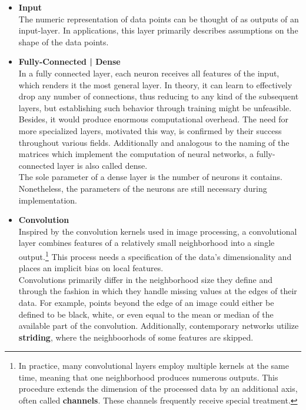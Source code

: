\begin{itemize}
	\item \textbf{Input}\\
	The numeric representation of data points can be thought of as outputs of an input-layer. In
	applications, this layer primarily describes assumptions on the shape of the data points. \\
	\item \textbf{Fully-Connected | Dense}\\
	In a fully connected layer, each neuron receives all features of the input, which renders it the most general layer.  In theory, it can learn to effectively drop any number of connections, thus reducing to any kind of the subsequent layers, but establishing such behavior through training might be unfeasible. Besides, it would produce enormous computational overhead. The need for more specialized layers, motivated this way, is confirmed by their success throughout various fields.
	Additionally and analogous to the naming of the matrices which implement the computation of neural networks, a fully-connected layer is also called dense.\\
	The sole parameter of a dense layer is the number of neurons it contains. Nonetheless, the parameters of the neurons are still necessary during implementation.\\
	\item \textbf{Convolution}\\
	Inspired by the convolution kernels used in image processing, a convolutional layer combines features of a relatively small neighborhood into a single output.\footnote{In practice, many convolutional layers employ multiple kernels at the same time, meaning that one neighborhood produces numerous outputs. This procedure extends the dimension of the processed data by an additional axis, often called \textbf{channels}. These channels frequently receive special treatment.} This process needs a specification of the data's dimensionality and places an implicit bias on local features. \\
	Convolutions primarily differ in the neighborhood size they define and through the fashion in which they handle missing values at the edges of their data. For example, points beyond the edge of an image could either be defined to be black, white, or even equal to the mean or median of the available part of the convolution. Additionally, contemporary networks utilize \textbf{striding}, where the neighboorhods of some features are skipped.\\

\end{itemize}
